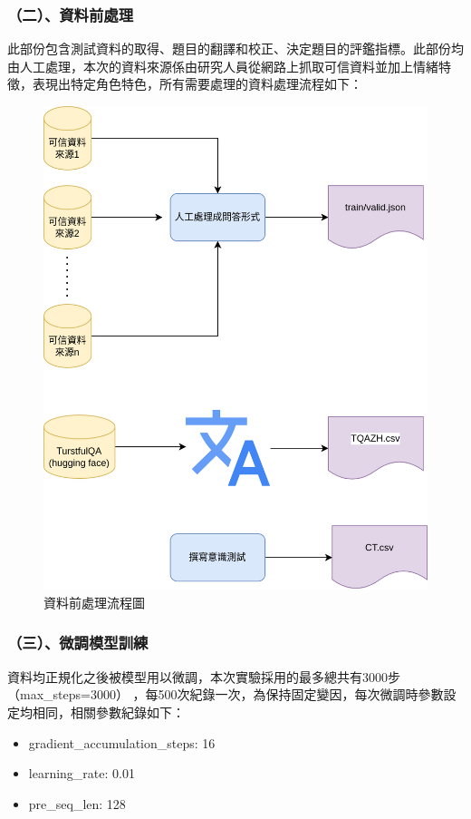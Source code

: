 \documentclass[8pt,a4paper,MingLiU,UTF8]{article}
\begin{document}
	\subsubsection{（二）、資料前處理}
	此部份包含測試資料的取得、題目的翻譯和校正、決定題目的評鑑指標。此部份均由人工處理，本次的資料來源係由研究人員從網路上抓取可信資料並加上情緒特徵，表現出特定角色特色，所有需要處理的資料處理流程如下：
	\begin{figure}[H]
		\centering
		\includegraphics[scale=0.3]{dataprocess}
		\caption{資料前處理流程圖}
	\end{figure}
	\subsubsection{（三）、微調模型訓練}
	資料均正規化之後被模型用以微調，本次實驗採用的最多總共有3000步（max\_steps=3000） ，每500次紀錄一次，為保持固定變因，每次微調時參數設定均相同，相關參數紀錄如下：
	\begin{itemize}
		\item gradient\_accumulation\_steps: 16
		\item learning\_rate: 0.01
		\item pre\_seq\_len: 128
	\end{itemize}
\end{document}
